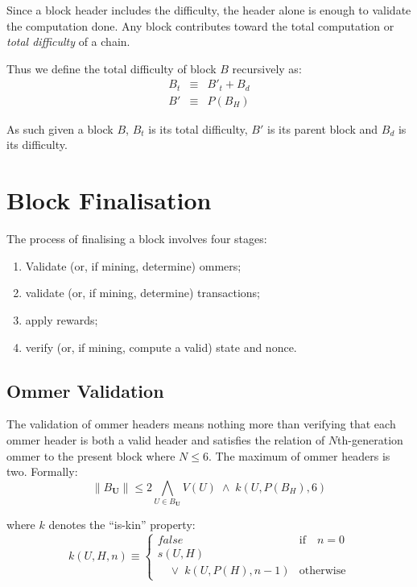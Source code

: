\documentclass[9pt,oneside]{amsart}
\begin{document}
\begin{multicols}{2}
Since a block header includes the difficulty, the header alone is enough to validate the computation done. Any block contributes toward the total computation or \textit{total difficulty} of a chain.

Thus we define the total difficulty of block $B$ recursively as:
\begin{eqnarray}
B_t & \equiv & B'_t + B_d \\
B' & \equiv & P(B_H)
\end{eqnarray}

As such given a block $B$, $B_t$ is its total difficulty, $B'$ is its parent block and $B_d$ is its difficulty.

\section{Block Finalisation} \label{ch:finalisation}

The process of finalising a block involves four stages:

\begin{enumerate}
\item Validate (or, if mining, determine) ommers;
\item validate (or, if mining, determine) transactions;
\item apply rewards;
\item verify (or, if mining, compute a valid) state and nonce.
\end{enumerate}

\subsection{Ommer Validation}

The validation of ommer headers means nothing more than verifying that each ommer header is both a valid header and satisfies the relation of $N$th-generation ommer to the present block where $N \leq 6$. The maximum of ommer headers is two. Formally:
\begin{equation}
\lVert B_\mathbf{U} \rVert \leqslant 2 \bigwedge_{U \in B_\mathbf{U}} V(U) \; \wedge \; k(U, P(B_H), 6)
\end{equation}

where $k$ denotes the ``is-kin'' property:
\begin{equation}
k(U, H, n) \equiv \begin{cases} false & \text{if} \quad n = 0 \\ 
s(U, H) &\\
\quad \vee \; k(U, P(H), n - 1) & \text{otherwise}
\end{cases}
\end{equation}


\end{multicols}
\end{document}
